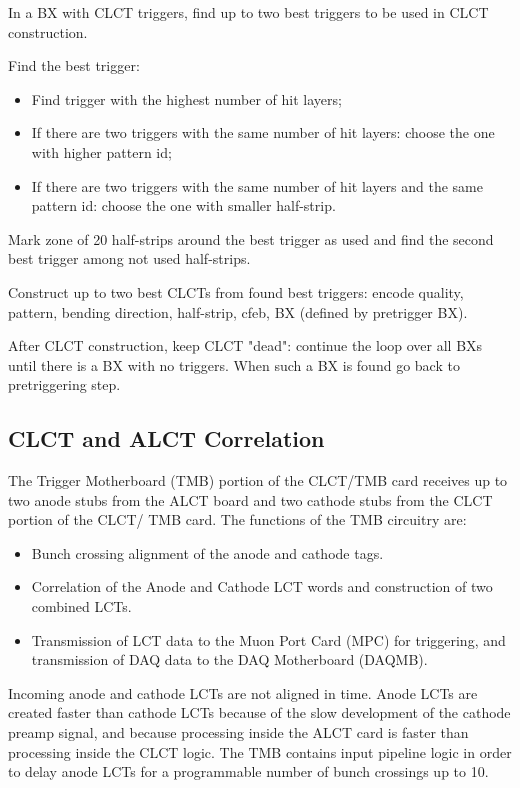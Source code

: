 In a BX with CLCT triggers, find up to two best triggers to be used in CLCT construction.

Find the best trigger:
\begin{itemize}
    \item Find trigger with the highest number of hit layers;
    \item If there are two triggers with the same number of hit layers: choose the one with higher pattern id;
    \item If there are two triggers with the same number of hit layers and the same pattern id: choose the one with smaller half-strip.
\end{itemize}

Mark zone of 20 half-strips around the best trigger as used and find the second best trigger among not used half-strips.

Construct up to two best CLCTs from found best triggers: encode quality, pattern, bending direction, half-strip, cfeb, BX (defined by pretrigger BX).

After CLCT construction, keep CLCT "dead": continue the loop over all BXs until there is a BX with no triggers. When such a BX is found go back to pretriggering step.

\newpage
\subsection{CLCT and ALCT Correlation}

The Trigger Motherboard (TMB) portion of the CLCT/TMB card receives up to two
anode stubs from the ALCT board and two cathode stubs from the CLCT portion of the CLCT/
TMB card. The functions of the TMB circuitry are:

\begin{itemize}
	\item Bunch crossing alignment of the anode and cathode tags.
	\item Correlation of the Anode and Cathode LCT words and construction of two combined LCTs.
	\item Transmission of LCT data to the Muon Port Card (MPC) for triggering, and transmission of DAQ data to the DAQ Motherboard (DAQMB).
\end{itemize}

Incoming anode and cathode LCTs are not aligned in time. Anode LCTs are created
faster than cathode LCTs because of the slow development of the cathode preamp signal, and
because processing inside the ALCT card is faster than processing inside the CLCT logic. The
TMB contains input pipeline logic in order to delay anode LCTs for a programmable number of
bunch crossings up to 10.

